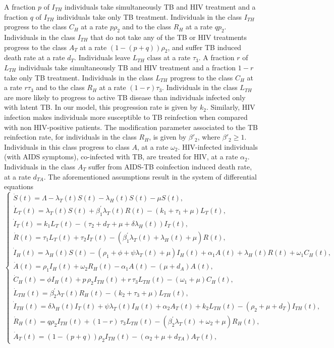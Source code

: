 \documentclass{my_aims}
\theoremstyle{definition}
\begin{document}
A fraction $p$ of $I_{TH}$ individuals take simultaneously TB
and HIV treatment and a fraction $q$ of $I_{TH}$ individuals take only TB treatment.
Individuals in the class $I_{TH}$ progress to the class $C_H$ at a rate $p \rho_2$
and to the class $R_H$ at a rate $q p_2$. Individuals in the class $I_{TH}$
that do not take any  of the TB or HIV treatments progress to the class $A_T$
at a rate $(1-(p+q)) \rho_2$, and suffer TB induced death rate at a rate $d_T$.
Individuals leave $L_{TH}$ class at a rate $\tau_3$. A fraction $r$ of $L_{TH}$
individuals take simultaneously TB and HIV treatment
and a fraction $1-r$ take only TB treatment.
Individuals in the class $L_{TH}$ progress to the class $C_H$ at a rate
$r \tau_3$ and to the class $R_H$ at a rate $(1-r) \tau_3$.
Individuals in the class $L_{TH}$ are more likely to progress
to active TB disease than individuals infected only with latent TB.
In our model, this progression rate is given by $k_2$.
Similarly, HIV infection makes individuals more susceptible to TB reinfection
when compared with non HIV-positive patients. The modification parameter associated
to the TB reinfection rate, for individuals in the class $R_{H}$, is given by $\beta'_2$,
where $\beta'_2 \geq 1$. Individuals in this class progress to class $A$, at a rate $\omega_2$.
HIV-infected individuals (with AIDS symptoms), co-infected with TB, are treated for HIV,
at a rate $\alpha_2$. Individuals in the class $A_T$ suffer from AIDS-TB
coinfection induced death rate, at a rate $d_{TA}$.
The aforementioned assumptions result in the system of differential
equations
\begin{equation}
\label{model:TB:HIV:Chronic:semcont}
\begin{cases}
\dot{S}(t) = \Lambda - \lambda_T(t) S(t) - \lambda_H(t) S(t) - \mu S(t),\\
\dot{L}_T(t) = \lambda_T(t) S(t) + \beta^{'}_1 \lambda_T(t) R(t) - (k_1 + \tau_1 + \mu)L_T(t),\\
\dot{I}_T(t) = k_1 L_T(t) - \left(\tau_2 +d_T +\mu + \delta \lambda_H(t)\right)I_T(t),\\
\dot{R}(t) = \tau_1 L_T(t) + \tau_2 I_T(t) - (\beta^{'}_1 \lambda_T(t) + \lambda_H(t) + \mu) R(t),\\
\dot{I}_H(t) = \lambda_H(t) S(t) - (\rho_1 + \phi + \psi \lambda_T(t) + \mu)I_H(t)
+ \alpha_1 A(t) + \lambda_H(t) R(t) + \omega_1 C_H(t), \\
\dot{A}(t) =  \rho_1 I_H(t) + \omega_2 R_H(t) - \alpha_1 A(t) - (\mu + d_A) A(t),\\
\dot{C}_H(t) = \phi I_H(t) + p \, \rho_2 I_{TH}(t) + r\,  \tau_3 L_{TH}(t) - (\omega_1 + \mu)C_H(t),\\
\dot{L}_{TH}(t) = \beta^{'}_2 \lambda_T(t) R_{H}(t) - (k_2 + \tau_3 + \mu) L_{TH}(t),\\
\dot{I}_{TH}(t) = \delta \lambda_H(t) I_T(t) + \psi \lambda_T(t) I_H(t)
+ \alpha_2 A_T(t)+ k_2 L_{TH}(t) - \left( \rho_2 + \mu + d_T \right)I_{TH}(t),\\
\dot{R}_{H}(t) = q \rho_2 I_{TH}(t) + (1-r)\, \tau_3 L_{TH}(t)
- \left(\beta^{'}_2 \lambda_T(t) + \omega_2 + \mu\right)R_{H}(t),\\
\dot{A}_T(t) = (1-(p+q))\rho_2 I_{TH}(t) -(\alpha_2 + \mu + d_{TA})A_T(t),
\end{cases}
\end{equation}
\end{document}
